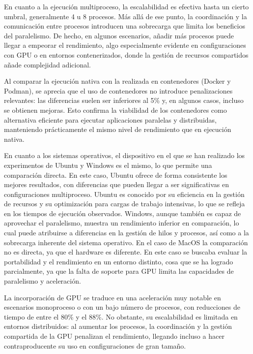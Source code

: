 En cuanto a la ejecución multiproceso, la escalabilidad es efectiva hasta un cierto umbral, generalmente 4 u 8 procesos. Más allá de ese punto, la coordinación y la comunicación entre procesos introducen una sobrecarga que limita los beneficios del paralelismo. De hecho, en algunos escenarios, añadir más procesos puede llegar a empeorar el rendimiento, algo especialmente evidente en configuraciones con GPU o en entornos contenerizados, donde la gestión de recursos compartidos añade complejidad adicional.

Al comparar la ejecución nativa con la realizada en contenedores (Docker y Podman), se aprecia que el uso de contenedores no introduce penalizaciones relevantes: las diferencias suelen ser inferiores al 5\% y, en algunos casos, incluso se obtienen mejoras. Esto confirma la viabilidad de los contenedores como alternativa eficiente para ejecutar aplicaciones paralelas y distribuidas, manteniendo prácticamente el mismo nivel de rendimiento que en ejecución nativa.

En cuanto a los sistemas operativos, el dispositivo en el que se han realizado los experimentos de Ubuntu y Windows es el mismo, lo que permite una comparación directa. En este caso, Ubuntu ofrece de forma consistente los mejores resultados, con diferencias que pueden llegar a ser significativas en configuraciones multiproceso. Ubuntu es conocido por su eficiencia en la gestión de recursos y su optimización para cargas de trabajo intensivas, lo que se refleja en los tiempos de ejecución observados. Windows, aunque también es capaz de aprovechar el paralelismo, muestra un rendimiento inferior en comparación, lo cual puede atribuirse a diferencias en la gestión de hilos y procesos, así como a la sobrecarga inherente del sistema operativo. En el caso de MacOS la comparación no es directa, ya que el hardware es diferente. En este caso se buscaba evaluar la portabilidad y el rendimiento en un entorno distinto, cosa que se ha logrado parcialmente, ya que la falta de soporte para GPU limita las capacidades de paralelismo y aceleración.

La incorporación de GPU se traduce en una aceleración muy notable en escenarios monoproceso o con un bajo número de procesos, con reducciones de tiempo de entre el 80\% y el 88\%. No obstante, su escalabilidad es limitada en entornos distribuidos: al aumentar los procesos, la coordinación y la gestión compartida de la GPU penalizan el rendimiento, llegando incluso a hacer contraproducente su uso en configuraciones de gran tamaño.

